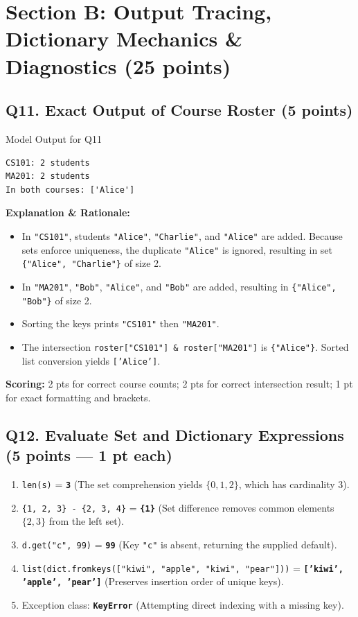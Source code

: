 \documentclass[11pt,a4paper]{article}
\begin{document}
\newpage
\section*{Section B: Output Tracing, Dictionary Mechanics \& Diagnostics (25 points)}

\subsection*{Q11. Exact Output of Course Roster (5 points)}
\begin{solbox}{Model Output for Q11}
\begin{verbatim}
CS101: 2 students
MA201: 2 students
In both courses: ['Alice']
\end{verbatim}
\end{solbox}
\textbf{Explanation \& Rationale:}
\begin{itemize}
\item In \texttt{"CS101"}, students \texttt{"Alice"}, \texttt{"Charlie"}, and \texttt{"Alice"} are added. Because sets enforce uniqueness, the duplicate \texttt{"Alice"} is ignored, resulting in set \texttt{\{"Alice", "Charlie"\}} of size 2.
\item In \texttt{"MA201"}, \texttt{"Bob"}, \texttt{"Alice"}, and \texttt{"Bob"} are added, resulting in \texttt{\{"Alice", "Bob"\}} of size 2.
\item Sorting the keys prints \texttt{"CS101"} then \texttt{"MA201"}.
\item The intersection \texttt{roster["CS101"] \& roster["MA201"]} is \texttt{\{"Alice"\}}. Sorted list conversion yields \texttt{['Alice']}.
\end{itemize}
\textbf{Scoring:} 2 pts for correct course counts; 2 pts for correct intersection result; 1 pt for exact formatting and brackets.

\subsection*{Q12. Evaluate Set and Dictionary Expressions (5 points --- 1 pt each)}
\begin{enumerate}[label=\alph*)]
\item \texttt{len(s)} = \textbf{\texttt{3}} \quad (The set comprehension yields $\{0, 1, 2\}$, which has cardinality 3).
\item \texttt{\{1, 2, 3\} - \{2, 3, 4\}} = \textbf{\texttt{\{1\}}} \quad (Set difference removes common elements $\{2, 3\}$ from the left set).
\item \texttt{d.get("c", 99)} = \textbf{\texttt{99}} \quad (Key \texttt{"c"} is absent, returning the supplied default).
\item \texttt{list(dict.fromkeys(["kiwi", "apple", "kiwi", "pear"]))} = \textbf{\texttt{['kiwi', 'apple', 'pear']}} \quad (Preserves insertion order of unique keys).
\item Exception class: \textbf{\texttt{KeyError}} \quad (Attempting direct indexing with a missing key).
\end{enumerate}
\end{document}
